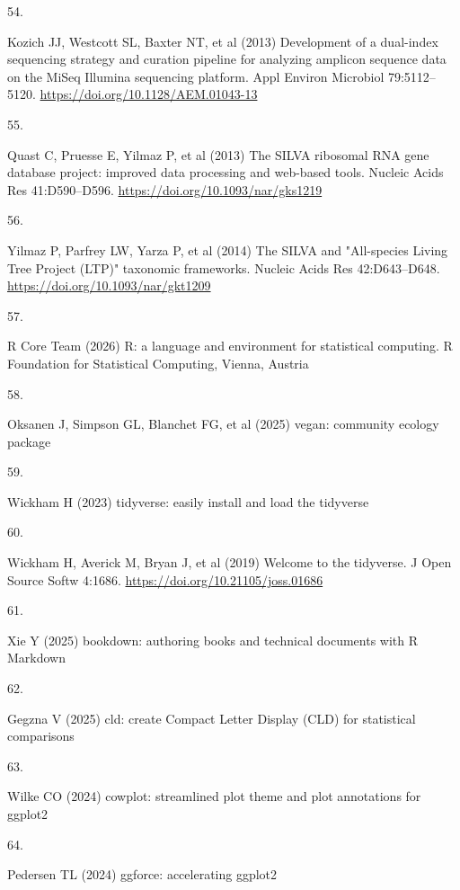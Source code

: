 \documentclass[
  12 pt,
]{article}
\newlength{\cslhangindent}
\newlength{\csllabelwidth}
\newenvironment{CSLReferences}[2] %
 {\begin{list}{}{%
  \setlength{\itemindent}{0pt}
  \setlength{\leftmargin}{0pt}
  \setlength{\parsep}{0pt}
  \ifodd #1
   \setlength{\leftmargin}{\cslhangindent}
   \setlength{\itemindent}{-1\cslhangindent}
  \fi
  \setlength{\itemsep}{#2\baselineskip}}}
 {\end{list}}
\newcommand{\CSLLeftMargin}[1]{\parbox[t]{\csllabelwidth}{\strut#1\strut}}
\newcommand{\CSLRightInline}[1]{\parbox[t]{\linewidth - \csllabelwidth}{\strut#1\strut}}
\begin{document}
\begin{CSLReferences}{0}{0}
\CSLLeftMargin{54. }%
\CSLRightInline{Kozich JJ, Westcott SL, Baxter NT, et al (2013) Development of a dual-index sequencing strategy and curation pipeline for analyzing amplicon sequence data on the {MiSeq Illumina} sequencing platform. Appl Environ Microbiol 79:5112--5120. \url{https://doi.org/10.1128/AEM.01043-13}}

\CSLLeftMargin{55. }%
\CSLRightInline{Quast C, Pruesse E, Yilmaz P, et al (2013) The {SILVA} ribosomal {RNA} gene database project: improved data processing and web-based tools. Nucleic Acids Res 41:D590--D596. \url{https://doi.org/10.1093/nar/gks1219}}

\CSLLeftMargin{56. }%
\CSLRightInline{Yilmaz P, Parfrey LW, Yarza P, et al (2014) The {SILVA} and "{All-species Living Tree Project} ({LTP})" taxonomic frameworks. Nucleic Acids Res 42:D643--D648. \url{https://doi.org/10.1093/nar/gkt1209}}

\CSLLeftMargin{57. }%
\CSLRightInline{R Core Team (2026) R: {a} language and environment for statistical computing. R Foundation for Statistical Computing, Vienna, Austria}

\CSLLeftMargin{58. }%
\CSLRightInline{Oksanen J, Simpson GL, Blanchet FG, et al (2025) {vegan}: {community} ecology package}

\CSLLeftMargin{59. }%
\CSLRightInline{Wickham H (2023) {tidyverse}: {easily} install and load the tidyverse}

\CSLLeftMargin{60. }%
\CSLRightInline{Wickham H, Averick M, Bryan J, et al (2019) Welcome to the {tidyverse}. J Open Source Softw 4:1686. \url{https://doi.org/10.21105/joss.01686}}

\CSLLeftMargin{61. }%
\CSLRightInline{Xie Y (2025) {bookdown}: {authoring} books and technical documents with {R} {Markdown}}

\CSLLeftMargin{62. }%
\CSLRightInline{Gegzna V (2025) {cld}: {create} {Compact Letter Display} (CLD) for statistical comparisons}

\CSLLeftMargin{63. }%
\CSLRightInline{Wilke CO (2024) {cowplot}: {streamlined} plot theme and plot annotations for ggplot2}

\CSLLeftMargin{64. }%
\CSLRightInline{Pedersen TL (2024) {ggforce}: {accelerating} ggplot2}


\end{CSLReferences}
\end{document}
